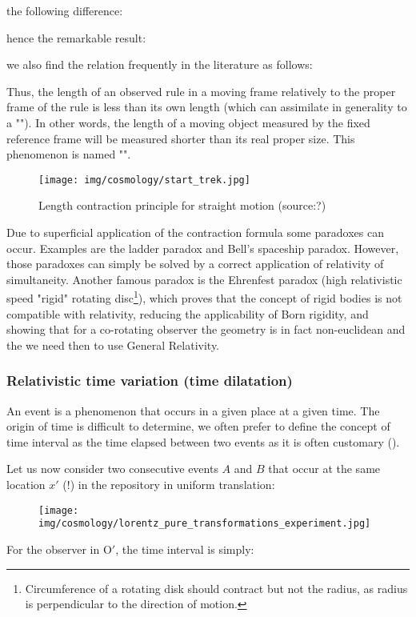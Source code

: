 	the following difference:
	
	hence the remarkable result:
	
	we also find the relation frequently in the literature as follows:
	
	Thus, the length of an observed rule in a moving frame relatively to the proper frame of the rule is less than its own length (which can assimilate in generality to a ""). In other words, the length of a moving object measured by the fixed reference frame will be measured shorter than its real proper size. This phenomenon is named "".
	\begin{figure}[H]
		\begin{center}
		\texttt{[image: img/cosmology/start\_trek.jpg]}
		\end{center}	
		\caption[Length contraction principle for straight motion]{Length contraction principle for straight motion (source:?)}
	\end{figure}
	Due to superficial application of the contraction formula some paradoxes can occur. Examples are the ladder paradox and Bell's spaceship paradox. However, those paradoxes can simply be solved by a correct application of relativity of simultaneity. Another famous paradox is the Ehrenfest paradox (high relativistic speed "rigid" rotating disc\footnote{Circumference of a rotating disk should contract but not the radius, as radius is perpendicular to the direction of motion.}), which proves that the concept of rigid bodies is not compatible with relativity, reducing the applicability of Born rigidity, and showing that for a co-rotating observer the geometry is in fact non-euclidean and the we need then to use General Relativity.
	
	\subsubsection{Relativistic time variation (time dilatation)}\label{relativistic time variation}
	An event is a phenomenon that occurs in a given place at a given time. The origin of time is difficult to determine, we often prefer to define the concept of time interval as the time elapsed between two events as it is often customary ().
	
	Let us now consider two consecutive events $A$ and $B$ that occur at the same location $x'$ (!) in the repository in uniform translation:
	\begin{figure}[H]
		\begin{center}
		\texttt{[image: img/cosmology/lorentz\_pure\_transformations\_experiment.jpg]}
		\end{center}	
	\end{figure}
	For the observer in $\text{O}'$, the time interval is simply:
	

